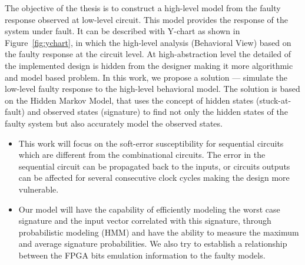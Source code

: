 The objective of the thesis is to construct a high-level model from the faulty response observed at low-level circuit. This model provides the response of the system under fault. It can be described with Y-chart as shown in Figure~\ref{fig:ychart}, in which the high-level analysis (Behavioral View) based on the faulty response at the circuit level. At high-abstraction level the detailed of the implemented design is hidden from the designer making it more algorithmic and model based problem. In this work, we propose a solution --- simulate the low-level faulty response to the high-level behavioral model. The solution is based on the Hidden Markov Model, that uses the concept of hidden states  (stuck-at-fault) and observed states (signature) to find not only the hidden states of the faulty system but also accurately model the observed states. 


\begin{itemize}


\item This work will focus on the soft-error susceptibility for sequential circuits which are different from the combinational circuits. The error in the sequential circuit can be propagated back to the inputs, or circuits outputs can be affected for several consecutive clock cycles making the design more vulnerable.  
\item Our model will have the capability of efficiently modeling the worst case signature and the input vector correlated with this signature, through probabilistic modeling (HMM) and have the ability to measure the maximum and average signature probabilities. We also try to establish a relationship between the FPGA bits emulation information to the faulty models.



\end{itemize}




